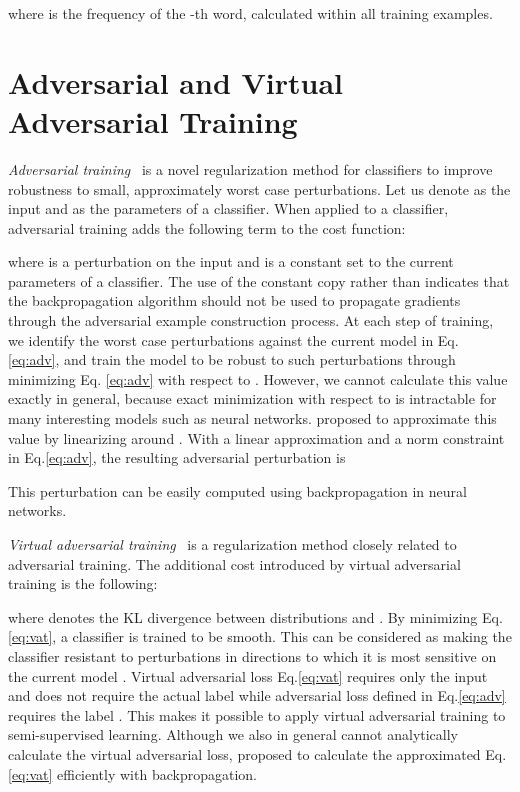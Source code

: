 \documentclass{article}
\begin{document}
where  is the frequency of the -th word, calculated within all training examples.

\section{\label{sec:adv_vadv}Adversarial and Virtual Adversarial Training}
\label{sec:adv}
\emph{Adversarial training}~\cite[]{goodfellow2014explaining} is a novel regularization
method for classifiers to improve robustness to small, approximately
worst case perturbations.
Let us denote  as the input and  as the parameters of a classifier.
When applied to a classifier, adversarial training adds the following term to
the cost function:

where  is a perturbation on the input and  is a constant
set to the current parameters of a classifier.
The use of the constant copy  rather than  indicates that
the backpropagation algorithm should not be used to propagate gradients through
the adversarial example construction process.
At each step of training, we identify the worst case perturbations 
against the current model  in Eq. \eqref{eq:adv}, and train the model to be
robust to such perturbations through minimizing Eq. \eqref{eq:adv} with respect to .  
However, we cannot calculate this value exactly in general, because
exact minimization with respect to  is intractable for many interesting
models such as neural networks.
\citet{goodfellow2014explaining} proposed to approximate
this value by linearizing  around .
With a linear approximation and a
 norm constraint in Eq.\eqref{eq:adv}, the resulting adversarial perturbation
is

This perturbation can be easily computed using backpropagation in neural networks.

\emph{Virtual adversarial training}~\cite[]{miyato2015distributional} is a
regularization method closely related to adversarial training. The additional cost introduced by
virtual adversarial training is the following:

where  denotes the KL divergence between distributions  and .
By minimizing Eq.\eqref{eq:vat}, a classifier is trained to be smooth. This can
be considered as making the classifier resistant to perturbations in
directions to which it is most sensitive on the current model .
Virtual adversarial loss Eq.\eqref{eq:vat} requires only the input  and does not
require the actual label  while adversarial loss defined in Eq.\eqref{eq:adv} requires the label .
This makes it possible to apply virtual adversarial training to semi-supervised learning.
Although we also in general cannot analytically calculate the virtual adversarial loss,
\citet{miyato2015distributional} proposed to calculate the approximated
Eq.\eqref{eq:vat} efficiently with backpropagation.
\end{document}
